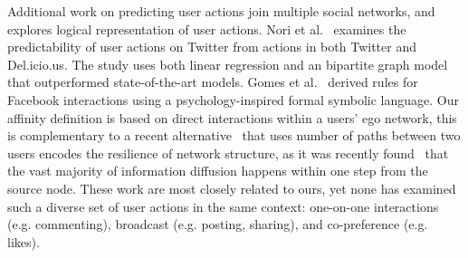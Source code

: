 Additional work on predicting user actions join multiple social networks, and explores logical representation of user actions. Nori et al.~\cite{nori2011exploiting} examines the predictability of user actions on Twitter from actions in both Twitter and Del.icio.us. The study uses both linear regression and an bipartite graph model that outperformed state-of-the-art models. Gomes et al.~\cite{gomes2011social} derived rules for Facebook interactions using a psychology-inspired formal symbolic language. 
Our affinity definition is based on direct interactions within a users' ego network, this is complementary to 
a recent alternative~\cite{Panigrahy2012ubr} that uses number of paths between two users encodes the resilience of network structure, 
as it was recently found~\cite{Goel2012structure} that the vast majority of information diffusion
happens within one step from the source node. 
These work are most closely related to ours, yet none has examined such a diverse set of user actions in the same context: one-on-one interactions (e.g. commenting), broadcast (e.g. posting, sharing), and co-preference (e.g. likes). 





